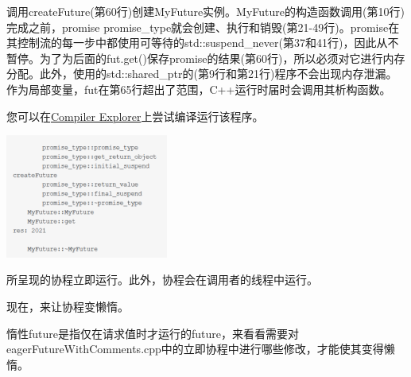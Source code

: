 调用createFuture(第60行)创建MyFuture实例。MyFuture的构造函数调用(第10行)完成之前，promise promise\_type就会创建、执行和销毁(第21-49行)。promise在其控制流的每一步中都使用可等待的std::suspend\_never(第37和41行)，因此从不暂停。为了为后面的fut.get()保存promise的结果(第60行)，所以必须对它进行内存分配。此外，使用的std::shared\_ptr的(第9行和第21行)程序不会出现内存泄漏。作为局部变量，fut在第65行超出了范围，C++运行时届时会调用其析构函数。

您可以在\href{https://godbolt.org/z/Y9naEx}{Compiler Explorer}上尝试编译运行该程序。

\begin{center}
\includegraphics[width=0.4\textwidth]{content/3/chapter7/images/8.png}\\
\end{center}

所呈现的协程立即运行。此外，协程会在调用者的线程中运行。

现在，来让协程变懒惰。


惰性future是指仅在请求值时才运行的future，来看看需要对eagerFutureWithComments.cpp中的立即协程中进行哪些修改，才能使其变得懒惰。

